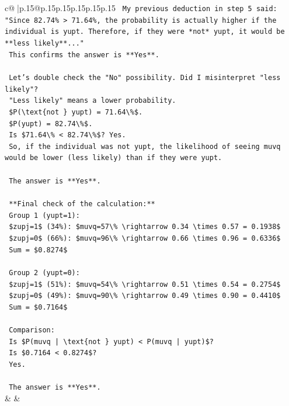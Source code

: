 \documentclass{article}
\begin{document}
{\begin{supertabular}{c@{$\;$}|p{.15\linewidth}@{}p{.15\linewidth}p{.15\linewidth}p{.15\linewidth}p{.15\linewidth}p{.15\linewidth}}
{{{\texttt{    My previous deduction in step 5 said: "Since 82.74\% > 71.64\%, the probability is actually higher if the individual is yupt. Therefore, if they were *not* yupt, it would be **less likely**..."} \\
\texttt{    This confirms the answer is **Yes**.} \\
\\ 
\texttt{    Let's double check the "No" possibility. Did I misinterpret "less likely"?} \\
\texttt{    "Less likely" means a lower probability.} \\
\texttt{    \$P(\textbackslash{}text\{not \} yupt) = 71.64\textbackslash{}\%\$.} \\
\texttt{    \$P(yupt) = 82.74\textbackslash{}\%\$.} \\
\texttt{    Is \$71.64\textbackslash{}\% < 82.74\textbackslash{}\%\$? Yes.} \\
\texttt{    So, if the individual was not yupt, the likelihood of seeing muvq would be lower (less likely) than if they were yupt.} \\
\\ 
\texttt{    The answer is **Yes**.} \\
\\ 
\texttt{    **Final check of the calculation:**} \\
\texttt{    Group 1 (yupt=1):} \\
\texttt{    \$zupj=1\$ (34\%): \$muvq=57\textbackslash{}\% \textbackslash{}rightarrow 0.34 \textbackslash{}times 0.57 = 0.1938\$} \\
\texttt{    \$zupj=0\$ (66\%): \$muvq=96\textbackslash{}\% \textbackslash{}rightarrow 0.66 \textbackslash{}times 0.96 = 0.6336\$} \\
\texttt{    Sum = \$0.8274\$} \\
\\ 
\texttt{    Group 2 (yupt=0):} \\
\texttt{    \$zupj=1\$ (51\%): \$muvq=54\textbackslash{}\% \textbackslash{}rightarrow 0.51 \textbackslash{}times 0.54 = 0.2754\$} \\
\texttt{    \$zupj=0\$ (49\%): \$muvq=90\textbackslash{}\% \textbackslash{}rightarrow 0.49 \textbackslash{}times 0.90 = 0.4410\$} \\
\texttt{    Sum = \$0.7164\$} \\
\\ 
\texttt{    Comparison:} \\
\texttt{    Is \$P(muvq | \textbackslash{}text\{not \} yupt) < P(muvq | yupt)\$?} \\
\texttt{    Is \$0.7164 < 0.8274\$?} \\
\texttt{    Yes.} \\
\\ 
\texttt{    The answer is **Yes**.} \\
            }
        }
    }
    & & \\ \\


\end{supertabular}}
\end{document}
